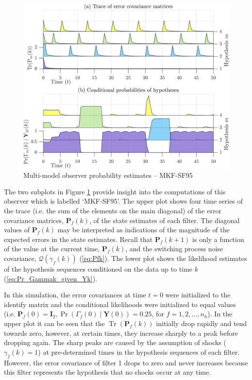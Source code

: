 \begin{figure}[htp]
	\centering
	\includegraphics[width=12cm]{images/rod_MKF_test_sim_MKF_SF95_prob.png}
	\caption{Multi-model observer probability estimates – MKF-SF95}
	\label{fig:rod-obs-sim-test-probs-SF95}
\end{figure}
The two subplots in Figure \ref{fig:rod-obs-sim-test-probs-SF95} provide insight into the computations of this observer which is labelled `MKF-SF95'. The upper plot shows four time series of the trace (i.e. the sum of the elements on the main diagonal) of the error covariance matrices, $\mathbf{P}_f(k)$, of the state estimates of each filter. The diagonal values of $\mathbf{P}_f(k)$ may be interpreted as indications of the magnitude of the expected errors in the state estimates. Recall that $\mathbf{P}_f(k+1)$ is only a function of the value at the current time, $\mathbf{P}_f(k)$, and the switching process noise covariance, $\mathcal{Q}(\gamma_f(k))$ (\ref{eq:Pfk}). The lower plot shows the likelihood estimates of the hypothesis sequences conditioned on the data up to time $k$ (\ref{eq:Pr_Gammak_given_Yk}).

In this simulation, the error covariances at time $t=0$ were initialized to the identify matrix and the conditional likelihoods were initialized to equal values (i.e. $\mathbf{P}_f(0)=\mathbf{I}_2,\operatorname{Pr}\left(\Gamma_f(0) \mid \mathbf{Y}(0)\right)=0.25$, for $f=1,2,...,n_h$). In the upper plot it can be seen that the $\operatorname{Tr}(\mathbf{P}_f(k))$ initially drop rapidly and tend towards zero, however, at certain times, they increase sharply to a peak before dropping again. The sharp peaks are caused by the assumption of shocks ($\gamma_f(k)=1$) at pre-determined times in the hypothesis sequences of each filter. However, the error covariance of filter 1 drops to zero and never increases because this filter represents the hypothesis that no shocks occur at any time.

